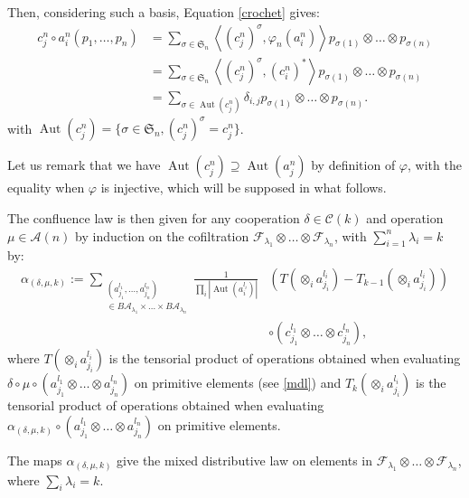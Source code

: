 \documentclass[11pt,leqno]{amsart}
\theoremstyle{definition}
\theoremstyle{plain}
\newcommand{\A}{ \mathcal{A} }
\newcommand{\C}{ \mathcal{C} }
\newcommand{\F}{ \mathcal{F} }
\begin{document}
Then, considering such a basis, Equation \eqref{crochet} gives:
\begin{align*}
c^n_j \circ a^n_i (p_1, \ldots, p_n) &= \sum_{\sigma \in \mathfrak{S}_n}\left\langle {( c^n_j)}^{\sigma}, \varphi_n(a^n_i)\right\rangle p_{\sigma(1)} \otimes \ldots \otimes p_{\sigma(n)} \\
&= \sum_{\sigma \in \mathfrak{S}_n} \left\langle  {(c^n_j)}^{\sigma}, (c^n_i)^*\right\rangle p_{\sigma(1)} \otimes \ldots \otimes p_{\sigma(n)} \\
&= \sum_{\sigma \in \operatorname{Aut}(c^n_j)} \delta_{i,j} p_{\sigma(1)} \otimes \ldots \otimes p_{\sigma(n)}.
\end{align*}
with $\operatorname{Aut}(c^n_j)=\{\sigma \in \mathfrak{S}_n, (c^n_j)^\sigma = c^n_j\}$.


Let us remark that we have $\operatorname{Aut}(c^n_j)  \supseteq \operatorname{Aut}(a^n_j)$ by definition of $\varphi$, with the equality when $\varphi$ is injective, which will be supposed in what follows. 

The confluence law is then given for any cooperation $\delta \in \C(k)$ and operation $\mu \in \A(n)$ by induction on the cofiltration $\F_{\lambda_1} \otimes \ldots \otimes \F_{\lambda_n}$, with $\sum_{i=1}^{n} \lambda_i = k$ by:
\begin{equation*}
\begin{split}
\alpha_{(\delta,\mu,k)}:= \sum_{\substack{(a^{l_1}_{j_1}, \ldots, a^{l_n}_{j_n}) \\ \in B\A_{\lambda_1} \times \ldots \times B\A_{\lambda_n}}} \frac{1}{\prod_i|\operatorname{Aut}(a_i^{l_i})|} &\left(  T(\otimes_i a_{j_i}^{l_i})- T_{k-1}(\otimes_i a_{j_i}^{l_i}) \right) \\ &\circ \left(c_{j_1}^{l_1} \otimes \ldots \otimes c_{j_n}^{l_n}\right),
\end{split}
\end{equation*}
where $T(\otimes_i a_{j_i}^{l_i})$ is the tensorial product of operations obtained when evaluating $\delta \circ \mu \circ \left(a_{j_1}^{l_1} \otimes \ldots \otimes a_{j_n}^{l_n}\right)$ on primitive elements (see \ref{mdl}) and $T_k(\otimes_i a_{j_i}^{l_i})$ is the tensorial product of operations obtained when evaluating $\alpha_{(\delta,\mu,k)} \circ \left(a_{j_1}^{l_1} \otimes \ldots \otimes a_{j_n}^{l_n}\right)$ on primitive elements.

The maps $\alpha_{(\delta,\mu,k)}$ give the mixed distributive law on elements in $\F_{\lambda_1}\otimes \ldots \otimes \F_{\lambda_n}$, where $\sum_i \lambda_i = k$.
\end{document}
